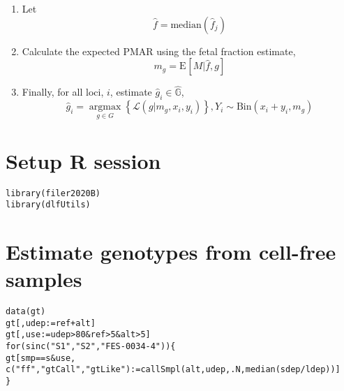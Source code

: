 \documentclass{article}\usepackage[]{graphicx}\usepackage[]{color}
\makeatletter
\newcommand{\hlnum}[1]{\textcolor[rgb]{0.063,0.58,0.627}{#1}}%
\newcommand{\hlstr}[1]{\textcolor[rgb]{0.063,0.58,0.627}{#1}}%
\newcommand{\hlopt}[1]{\textcolor[rgb]{0.196,0.196,0.196}{#1}}%
\newcommand{\hlstd}[1]{\textcolor[rgb]{0.196,0.196,0.196}{#1}}%
\newcommand{\hlkwa}[1]{\textcolor[rgb]{0.231,0.416,0.784}{#1}}%
\newcommand{\hlkwb}[1]{\textcolor[rgb]{0.627,0,0.314}{#1}}%
\newcommand{\hlkwd}[1]{\textcolor[rgb]{0.78,0.227,0.412}{#1}}%
\newenvironment{kframe}{%
 \def\at@end@of@kframe{}%
 \ifinner\ifhmode%
  \def\at@end@of@kframe{\end{minipage}}%
  \begin{minipage}{\columnwidth}%
 \fi\fi%
 \def\FrameCommand##1{\hskip\@totalleftmargin \hskip-\fboxsep
 \colorbox{shadecolor}{##1}\hskip-\fboxsep
     \hskip-\linewidth \hskip-\@totalleftmargin \hskip\columnwidth}%
 \MakeFramed {\advance\hsize-\width
   \@totalleftmargin\z@ \linewidth\hsize
   \@setminipage}}%
 {\par\unskip\endMakeFramed%
 \at@end@of@kframe}
\newenvironment{knitrout}{}{} %
\newcommand{\E}[2][]{\text{E}_{#1}\left[#2\right]}
\makeatother
\begin{document}
\begin{enumerate}
  \item Let
  \begin{equation}
    \hat{f} = \text{median}\left(\hat{f}_j\right)
  \end{equation}

  \item Calculate the expected PMAR using the fetal fraction estimate,
  \begin{equation}
    m_g = \E{M|\hat{f},g}
  \end{equation}

  \item Finally, for all loci, $i$, estimate $\hat{g}_i \in \hat{\mathbb{G}}$,
  \begin{equation}
  \hat{g}_i = \mathop{\text{argmax}}\limits_{g \in G}\left\{\mathcal{L}(g \rvert m_g,x_i,y_i)\right\}, Y_{i} \sim \text{Bin}(x_i + y_i, m_g)
  \end{equation}

\end{enumerate}

\newpage
\section{Setup R session}

\begin{knitrout}
\color{fgcolor}\begin{kframe}
\begin{alltt}
\hlkwd{library}\hlstd{(filer2020B)}
\hlkwd{library}\hlstd{(dlfUtils)}
\end{alltt}
\end{kframe}
\end{knitrout}

\section{Estimate genotypes from cell-free samples}

\begin{knitrout}
\color{fgcolor}\begin{kframe}
\begin{alltt}
\hlkwd{data}\hlstd{(gt)}
\hlstd{gt[ , udep} \hlkwb{:=} \hlstd{ref} \hlopt{+} \hlstd{alt]}
\hlstd{gt[ , use} \hlkwb{:=} \hlstd{udep} \hlopt{>} \hlnum{80} \hlopt{&} \hlstd{ref} \hlopt{>} \hlnum{5} \hlopt{&} \hlstd{alt} \hlopt{>} \hlnum{5}\hlstd{]}
\hlkwa{for} \hlstd{(s} \hlkwa{in} \hlkwd{c}\hlstd{(}\hlstr{"S1"}\hlstd{,} \hlstr{"S2"}\hlstd{,} \hlstr{"FES-0034-4"}\hlstd{)) \{}
  \hlstd{gt[smp} \hlopt{==} \hlstd{s} \hlopt{&} \hlstd{use,}
     \hlkwd{c}\hlstd{(}\hlstr{"ff"}\hlstd{,} \hlstr{"gtCall"}\hlstd{,} \hlstr{"gtLike"}\hlstd{)} \hlkwb{:=} \hlkwd{callSmpl}\hlstd{(alt, udep, .N,} \hlkwd{median}\hlstd{(sdep}\hlopt{/}\hlstd{ldep))]}
\hlstd{\}}
\end{alltt}
\end{kframe}
\end{knitrout}
\end{document}
